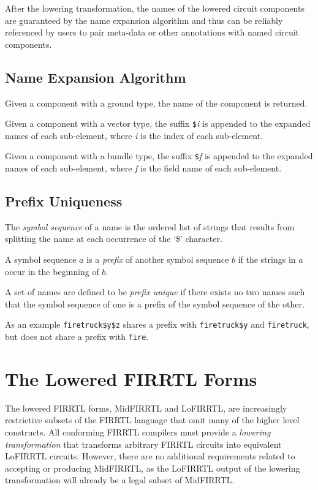 \documentclass[12pt]{article}
\begin{document}
After the lowering transformation, the names of the lowered circuit components are guaranteed by the name expansion algorithm and thus can be reliably referenced by users to pair meta-data or other annotations with named circuit components.

\subsection{Name Expansion Algorithm} \label{expansion_algorithm}

Given a component with a ground type, the name of the component is returned.

Given a component with a vector type, the suffix \verb|$|{\em i} is appended to the expanded names of each sub-element, where {\em i} is the index of each sub-element.

Given a component with a bundle type, the suffix \verb|$|{\em f} is appended to the expanded names of each sub-element, where {\em f} is the field name of each sub-element.

\subsection{Prefix Uniqueness} \label{prefix_unique}

The {\em symbol sequence} of a name is the ordered list of strings that results from splitting the name at each occurrence of the `\$' character.

A symbol sequence $a$ is a {\em prefix} of another symbol sequence $b$ if the strings in $a$ occur in the beginning of $b$.

A set of names are defined to be {\em prefix unique} if there exists no two names such that the symbol sequence of one is a prefix of the symbol sequence of the other.

As an example \verb|firetruck$y$z| shares a prefix with \verb|firetruck$y| and \verb|firetruck|, but does not share a prefix with \verb|fire|.

\section{The Lowered FIRRTL Forms}

The lowered FIRRTL forms, MidFIRRTL and LoFIRRTL, are increasingly restrictive subsets of the FIRRTL language that omit many of the higher level constructs. All conforming FIRRTL compilers must provide a {\em lowering transformation} that transforms arbitrary FIRRTL circuits into equivalent LoFIRRTL circuits. However, there are no additional requirements related to accepting or producing MidFIRRTL, as the LoFIRRTL output of the lowering transformation will already be a legal subset of MidFIRRTL.
\end{document}
